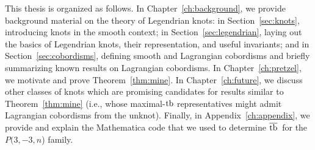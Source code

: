 This thesis is organized as follows.
In Chapter~\ref{ch:background}, we provide background material on the theory of Legendrian knots: in Section~\ref{sec:knots}, introducing knots in the smooth context; in Section~\ref{sec:legendrian}, laying out the basics of Legendrian knots, their representation, and useful invariants; and in Section~\ref{sec:cobordisms}, defining smooth and Lagrangian cobordisms and briefly summarizing known results on Lagrangian cobordisms.
In Chapter~\ref{ch:pretzel}, we motivate and prove Theorem~\ref{thm:mine}.
In Chapter~\ref{ch:future}, we discuss other classes of knots which are promising candidates for results similar to Theorem~\ref{thm:mine} (i.e., whose maximal-$\operatorname{tb}$ representatives might admit Lagrangian cobordisms from the unknot).
Finally, in Appendix~\ref{ch:appendix}, we provide and explain the Mathematica code that we used to determine $\overline{\operatorname{tb}}\,$ for the $P(3, -3, n$) family.

